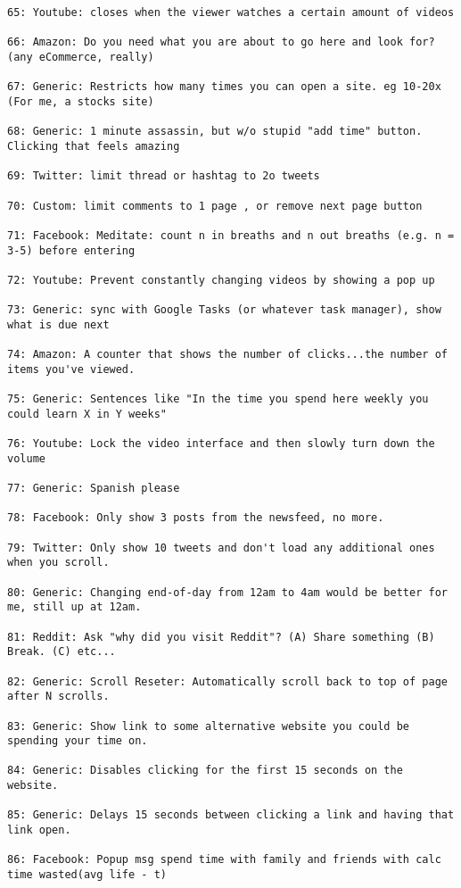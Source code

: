\begin{lstlisting}[breaklines]
65: Youtube: closes when the viewer watches a certain amount of videos

66: Amazon: Do you need what you are about to go here and look for? (any eCommerce, really)

67: Generic: Restricts how many times you can open a site. eg 10-20x (For me, a stocks site)

68: Generic: 1 minute assassin, but w/o stupid "add time" button. Clicking that feels amazing

69: Twitter: limit thread or hashtag to 2o tweets

70: Custom: limit comments to 1 page , or remove next page button

71: Facebook: Meditate: count n in breaths and n out breaths (e.g. n = 3-5) before entering

72: Youtube: Prevent constantly changing videos by showing a pop up

73: Generic: sync with Google Tasks (or whatever task manager), show what is due next

74: Amazon: A counter that shows the number of clicks...the number of items you've viewed.

75: Generic: Sentences like "In the time you spend here weekly you could learn X in Y weeks"

76: Youtube: Lock the video interface and then slowly turn down the volume

77: Generic: Spanish please

78: Facebook: Only show 3 posts from the newsfeed, no more.

79: Twitter: Only show 10 tweets and don't load any additional ones when you scroll.

80: Generic: Changing end-of-day from 12am to 4am would be better for me, still up at 12am.

81: Reddit: Ask "why did you visit Reddit"? (A) Share something (B) Break. (C) etc...

82: Generic: Scroll Reseter: Automatically scroll back to top of page after N scrolls.

83: Generic: Show link to some alternative website you could be spending your time on.

84: Generic: Disables clicking for the first 15 seconds on the website.

85: Generic: Delays 15 seconds between clicking a link and having that link open.

86: Facebook: Popup msg spend time with family and friends with calc time wasted(avg life - t)


\end{lstlisting}
